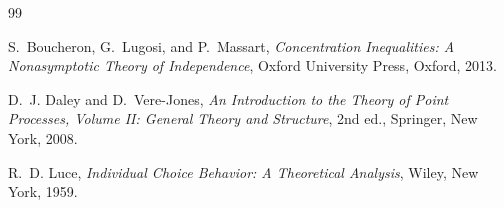 \documentclass[11pt]{article}
\newcommand{\1}{\mathbf 1}
\theoremstyle{definition}
\theoremstyle{remark}
\begin{document}
\begin{thebibliography}{99}

S.~Boucheron, G.~Lugosi, and P.~Massart,
\emph{Concentration Inequalities: A Nonasymptotic Theory of Independence},
Oxford University Press, Oxford, 2013.

D.~J. Daley and D.~Vere-Jones,
\emph{An Introduction to the Theory of Point Processes, Volume II:
General Theory and Structure}, 2nd ed., Springer, New York, 2008.


R.~D. Luce,
\emph{Individual Choice Behavior: A Theoretical Analysis},
Wiley, New York, 1959.

\end{thebibliography}
\end{document}
